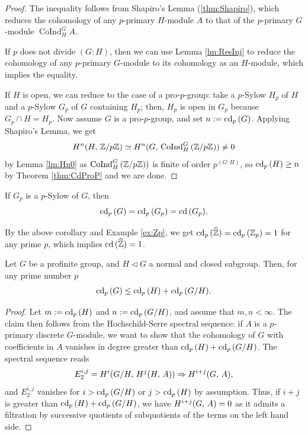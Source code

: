 \documentclass[a4paper, oneside]{memoir}
\begin{document}
\begin{proof}
	The inequality follows from Shapiro's Lemma (\ref{thm:Shapiro}), which reduces the cohomology of any $p$-primary $H$-module $A$ to that of the $p$-primary $G$-module $\operatorname{CoInd}_{H}^{G}{A}$.

	If $p$ does not divide $(G:H)$, then we can use Lemma \ref{lm:ResInj} to reduce the cohomology of any $p$-primary $G$-module to its cohomology as an $H$-module, which implies the equality.

	If $H$ is open, we can reduce to the case of a pro-$p$-group: take a $p$-Sylow $H_p$ of $H$ and a $p$-Sylow $G_p$ of $G$ containing $H_p$; then, $H_p$ is open in $G_p$ because $G_p\cap H=H_p$. Now assume $G$ is a pro-$p$-group, and set $n:=\operatorname{cd}_p{(G)}$. Applying Shapiro's Lemma, we get
	\[
		H^{n}( H, \, \mathbb{Z}/{p\mathbb{Z}} )\simeq H^{n}( G, \, \operatorname{CoInd}_{H}^{G}{(\mathbb{Z}/{p\mathbb{Z}})} )\neq0
	\]
	by Lemma \ref{lm:Hn0} as $\operatorname{CoInd}_H^G{(\mathbb{Z}/{p\mathbb{Z}})})$ is finite of order $p^{(G:H)}$, so $\operatorname{cd}_p{(H)}\geq n$ by Theorem \ref{thm:CdProP}	and we are done.
\end{proof}

\begin{corollary}\label{cor:CdSylow}
	If $G_p$ is a $p$-Sylow of $G$, then
	\[
		\operatorname{cd}_p{(G)}= \operatorname{cd}_p{(G_p)} = \operatorname{cd}{(G_p)}.
	\]
\end{corollary}

\begin{example}\label{ex:Zhat}
	By the above corollary and Example \ref{ex:Zp}, we get $\operatorname{cd}_p{(\widehat{\mathbb{Z}})}=\operatorname{cd}_p{(\mathbb{Z}_p)}=1$ for any prime $p$, which implies $\operatorname{cd}{(\widehat{\mathbb{Z}})}=1$.
\end{example}

\begin{proposition}\label{prop:CdIneq}
	Let $G$ be a profinite group, and $H \lhd G$ a normal and closed subgroup. Then, for any prime number $p$
	\[
		\operatorname{cd}_p{(G)} \leq \operatorname{cd}_p{(H)} + \operatorname{cd}_p{(G/H)}.
	\]
\end{proposition}
\begin{proof}
	Let $m:=\operatorname{cd}_p{(H)}$ and $n:=\operatorname{cd}_p{(G/H)}$, and assume that $m,n<\infty$. The claim then follows from the Hochschild-Serre spectral sequence: if $A$ is a $p$-primary discrete $G$-module, we want to show that the cohomology of $G$ with coefficients in $A$ vanishes in degree greater than $\operatorname{cd}_p{(H)}+\operatorname{cd}_p{(G/H)}$. The spectral sequence reads
	\[
		E_2^{i,j}=H^{i}( G/H, \, H^{j}( H, \, A ) )\Rightarrow H^{i+j}( G, \, A ),
	\]
	and $E_2^{i,j}$ vanishes for $i>\operatorname{cd}_p{(G/H)}$ or $j>\operatorname{cd}_p{(H)}$ by assumption. Thus, if $i+j$ is greater than $\operatorname{cd}_p{(H)}+\operatorname{cd}_p{(G/H)}$, we have $H^{i+j}( G, \, A )=0$ as it admits a filtration by successive quotients of subquotients of the terms on the left hand side.
\end{proof}
\end{document}
